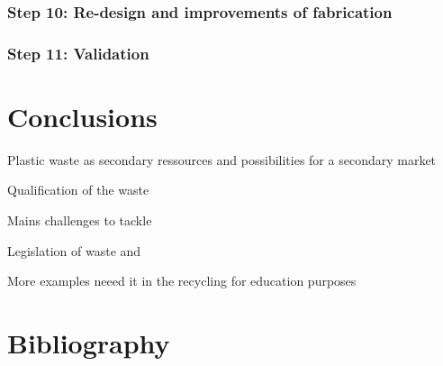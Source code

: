 \documentclass[
  11pt,
]{article}
\begin{document}
\hypertarget{step-10-re-design-and-improvements-of-fabrication}{%
\subsubsection{Step 10: Re-design and improvements of
fabrication}\label{step-10-re-design-and-improvements-of-fabrication}}

\hypertarget{step-11-validation}{%
\subsubsection{Step 11: Validation}\label{step-11-validation}}

\hypertarget{conclusions}{%
\section{Conclusions}\label{conclusions}}

Plastic waste as secondary ressources and possibilities for a secondary
market

Qualification of the waste

Mains challenges to tackle

Legislation of waste and

More examples neeed it in the recycling for education purposes

\newpage

\hypertarget{bibliography}{%
\section*{Bibliography}\label{bibliography}}
\end{document}
